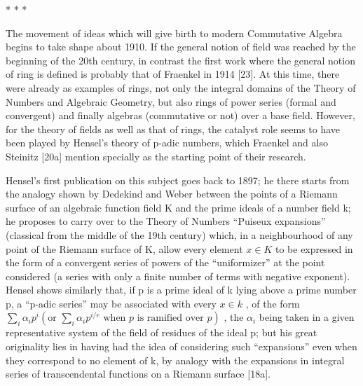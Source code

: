 \begin{center}* * *\end{center}

The movement of ideas which will give birth to modern Commutative Algebra begins to take shape about 1910. If the general notion of field was reached by the beginning of the 20th century, in contrast the first work where the general notion of ring is defined is probably that of Fraenkel in 1914 {[}23{]}. At this time, there were already as examples of rings, not only the integral domains of the Theory of Numbers and Algebraic Geometry, but also rings of power series (formal and convergent) and finally algebras (commutative or not) over a base field. However, for the theory of fields as well as that of rings, the catalyst role seems to have been played by Hensel's theory of p-adic numbers, which Fraenkel and also Steinitz {[}20a{]} mention specially as the starting point of their research.

Hensel's first publication on this subject goes back to 1897; he there starts from the analogy shown by Dedekind and Weber between the points of a Riemann surface of an algebraic function field K and the prime ideals of a number field k; he proposes to carry over to the Theory of Numbers ``Puiseux expansions'' (classical from the middle of the 19th century) which, in a neighbourhood of any point of the Riemann surface of K, allow every element \(x \in K\) to be expressed in the form of a convergent series of powers of the ``uniformizer'' at the point considered (a series with only a finite number of terms with negative exponent). Hensel shows similarly that, if p is a prime ideal of k lying above a prime number p, a ``p-adic series'' may be associated with every \(x \in k\) , of the form \(\sum_{i} \alpha_{i} p^{i} \left( \text{or } \sum_{i} \alpha_{i} p^{i/e} \text{ when } p \text{ is ramified over } p \right)\) , the \(\alpha_{i}\) being taken in a given representative system of the field of residues of the ideal p; but his great originality lies in having had the idea of considering such ``expansions'' even when they correspond to no element of k, by analogy with the expansions in integral series of transcendental functions on a Riemann surface {[}18a{]}.

